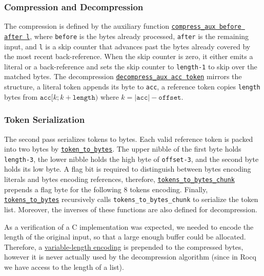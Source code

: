 \documentclass[
  a4paper, twocolumn, DIV=calc]{scrartcl}
\begin{document}
\subsubsection{Compression and Decompression}
The compression is defined by the auxiliary function
\href{https://github.com/Jatana/LZ78FormalVerification/blob/2819b54b6eb88639461c4fd3504fbc2a87e8cbc0/lz77/LZ.v#L7}
{\texttt{compress\_aux before after l}}, where \texttt{before} is the bytes
already processed, \texttt{after} is the remaining input, and \texttt{l} is a
skip counter that advances past the bytes already covered by the most recent
back-reference. When the skip counter is zero, it either emits a literal or a
back-reference and sets the skip counter to \texttt{length-1} to skip over the
matched bytes.
The decompression
\href{https://github.com/Jatana/LZ78FormalVerification/blob/2819b54b6eb88639461c4fd3504fbc2a87e8cbc0/lz77/LZ.v#L21}{\texttt{decompress\_aux acc token}}
mirrors the structure, a literal token appends its byte to \texttt{acc}, a reference token
copies \texttt{length} bytes from $\texttt{acc}[k; k+\texttt{length})$ where
$k=|\texttt{acc}|-\texttt{offset}$.

\subsubsection{Token Serialization}
The second pass serializes tokens to bytes. Each valid reference token is packed
into two bytes by
\href{https://github.com/Jatana/LZ78FormalVerification/blob/2819b54b6eb88639461c4fd3504fbc2a87e8cbc0/lz77/LZ_Tokens.v#L200}{\texttt{token\_to\_bytes}}.
The upper nibble of the first byte holds \texttt{length-3}, the lower nibble
holds the high byte of \texttt{offset-3}, and the second byte holds its low
byte.
A flag bit is required to distinguish between bytes encoding literals and bytes
encoding references, therefore,
\href{https://github.com/Jatana/LZ78FormalVerification/blob/2819b54b6eb88639461c4fd3504fbc2a87e8cbc0/lz77/LZ_Tokens.v#L218}{\texttt{tokens\_to\_bytes\_chunk}}
prepends a flag byte for the following 8 tokens encoding.
Finally,
\href{https://github.com/Jatana/LZ78FormalVerification/blob/2819b54b6eb88639461c4fd3504fbc2a87e8cbc0/lz77/LZ_Tokens.v#L245}{\texttt{tokens\_to\_bytes}}
recursively calls \texttt{tokens\_to\_bytes\_chunk} to serialize the token list.
Moreover, the inverses of these functions are also defined for decompression.

As a verification of a C implementation was expected, we needed to encode the length of
the original input, so that a large enough buffer could be allocated. Therefore,
a \href{https://github.com/Jatana/LZ78FormalVerification/blob/2819b54b6eb88639461c4fd3504fbc2a87e8cbc0/lz77/LZ_Tokens.v#L34}{variable-length
encoding} is prepended to the compressed bytes, however it is never actually
used by the decompression algorithm (since in Rocq we have access to the length of a list).
\end{document}
